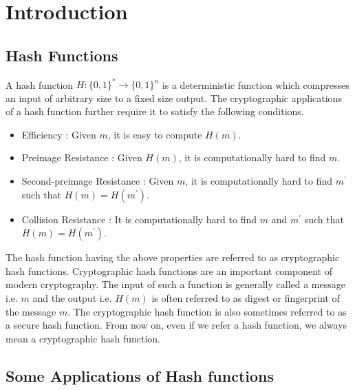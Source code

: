\chapter{Introduction}
\label{chap:intro}

\section{Hash Functions}

A hash function $H:\{0,1\}^* \rightarrow \{0,1\}^n $ is a deterministic function which compresses an input of arbitrary size to a fixed size output. The cryptographic applications of a hash function further require it to satisfy the following conditions.

\begin{itemize}\setlength\itemindent{20pt}
    \item Efficiency : Given $m$, it is easy to compute $H(m)$.
    \item Preimage Resistance : Given $H(m)$, it is computationally hard to find $m$.
    \item Second-preimage Resistance : Given $m$, it is computationally hard to find $m^\prime$ such that $H(m)=H(m^\prime)$.
    \item Collision Resistance : It is computationally hard to find $m$ and $m^\prime$ such that $H(m)=H(m^\prime)$.
\end{itemize}

The hash function having the above properties are referred to as cryptographic hash functions. Cryptographic hash functions are an important component of modern cryptography. The input of such a function is generally called a message i.e. $m$ and the output i.e. $H(m)$ is often referred to as digest or fingerprint of the message $m$. The cryptographic hash function is also sometimes referred to as a secure hash function. From now on, even if we refer a hash function, we always mean a cryptographic hash function.

\section{Some Applications of Hash functions}

